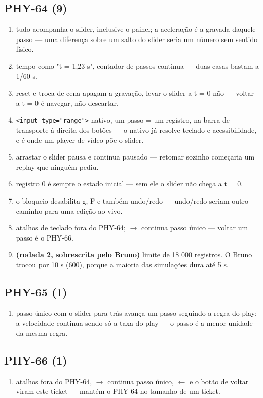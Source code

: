\documentclass[11pt,a4paper]{article}
\begin{document}
{\subsection*{PHY-64 (9)}
\begin{enumerate}
  \item tudo acompanha o slider, inclusive o painel; a aceleração é a gravada daquele passo --- uma diferença sobre um salto do slider seria um número sem sentido físico.
  \item tempo como "t = 1,23 s", contador de passos continua --- duas casas bastam a 1/60 s.
  \item reset e troca de cena apagam a gravação, levar o slider a t = 0 não --- voltar a t = 0 é navegar, não descartar.
  \item \texttt{<input type="range">} nativo, um passo = um registro, na barra de transporte à direita dos botões --- o nativo já resolve teclado e acessibilidade, e é onde um player de vídeo põe o slider.
  \item arrastar o slider pausa e continua pausado --- retomar sozinho começaria um replay que ninguém pediu.
  \item registro 0 é sempre o estado inicial --- sem ele o slider não chega a t = 0.
  \item o bloqueio desabilita g, F e também undo/redo --- undo/redo seriam outro caminho para uma edição ao vivo.
  \item atalhos de teclado fora do PHY-64; $\to$ continua passo único --- voltar um passo é o PHY-66.
  \item \textbf{(rodada 2, sobrescrita pelo Bruno)} limite de 18 000 registros. O Bruno trocou por 10 s (600), porque a maioria das simulações dura até 5 s.
\end{enumerate}
\subsection*{PHY-65 (1)}
\begin{enumerate}
  \item passo único com o slider para trás avança um passo seguindo a regra do play; a velocidade continua sendo só a taxa do play --- o passo é a menor unidade da mesma regra.
\end{enumerate}
\subsection*{PHY-66 (1)}
\begin{enumerate}
  \item atalhos fora do PHY-64, $\to$ continua passo único, $\leftarrow$ e o botão de voltar viram este ticket --- mantém o PHY-64 no tamanho de um ticket.
\end{enumerate}
}
\end{document}

